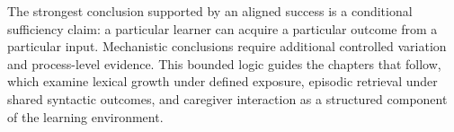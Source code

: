 The strongest conclusion supported by an aligned success is a conditional sufficiency claim: a particular learner can acquire a particular outcome from a particular input. Mechanistic conclusions require additional controlled variation and process-level evidence. This bounded logic guides the chapters that follow, which examine lexical growth under defined exposure, episodic retrieval under shared syntactic outcomes, and caregiver interaction as a structured component of the learning environment.
